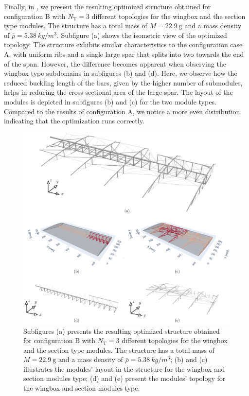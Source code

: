 Finally, in , we present the resulting optimized structure obtained for configuration B with $N_\text{T}=3$ different topologies for the wingbox and the section type modules. The structure has a total mass of $M=\qty{22.9}{\gram}$ and a mass density of $\bar{\rho}=\qty{5.38}{kg/m^3}$. Subfigure (a) shows the isometric view of the optimized topology. The structure exhibits similar characteristics to the configuration case A, with uniform ribs and a single large spar that splits into two towards the end of the span. However, the difference becomes apparent when observing the wingbox type subdomains in subfigures (b) and (d). Here, we observe how the reduced buckling length of the bars, given by the higher number of submodules, helps in reducing the cross-sectional area of the large spar. The layout of the modules is depicted in subfigures (b) and (c) for the two module types. Compared to the results of configuration A, we notice a more even distribution, indicating that the optimization runs correctly.

\begin{figure}
    \centering
    \includegraphics[width=\linewidth]{figures/07_aeronautic/00_NACA_b_sol_3/gs_a.pdf}
        \caption{Subfigures (a) presents the resulting optimized structure obtained for configuration B with $N_\text{T}=3$ different topologies for the wingbox and the section type modules. The structure has a total mass of $M=\qty{22.9}{\gram}$ and a mass density of $\bar{\rho}=\qty{5.38}{kg/m^3}$; (b) and (c) illustrates the modules' layout in the structure for the wingbox and section modules type; (d) and (e) present the modules' topology for the wingbox and section modules type.}
    \label{fig:07_topology_naca_b}
\end{figure}

